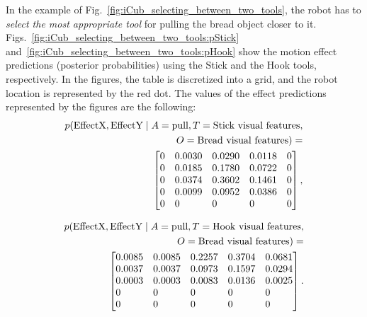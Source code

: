 In the example of
Fig.~\ref{fig:iCub_selecting_between_two_tools}, the robot has to \emph{select the most appropriate tool}
for pulling
the bread object
closer to it.
Figs.~\ref{fig:iCub_selecting_between_two_tools:pStick} and~\ref{fig:iCub_selecting_between_two_tools:pHook} show the motion effect predictions (posterior probabilities) using the Stick and the Hook tools, respectively.
In the figures, the table is discretized into a grid, and the robot location is represented by the red dot.
The values of the effect predictions represented by the figures are the following:
\begin{equation} \label{eq:posterior_pull_with_stick}
\begin{split}
p(\EffectX, \EffectY \given A=\text{pull}, T=\text{Stick visual features}, \\
O=\text{Bread visual features}) = \\
    \begin{bmatrix*}[l] %
    0 &   0.0030 &   0.0290 &   0.0118 &        0 \\
    0 &   0.0185 &   0.1780 &   0.0722 &        0 \\
    0 &   0.0374 &   0.3602 &   0.1461 &        0 \\
    0 &   0.0099 &   0.0952 &   0.0386 &        0 \\
    0 &        0 &        0 &        0 &        0
    \end{bmatrix*},
\end{split}
\end{equation}

\begin{equation} \label{eq:posterior_pull_with_hook}
\begin{split}
p(\EffectX, \EffectY \given A=\text{pull}, T=\text{Hook visual features}, \\
O=\text{Bread visual features}) = \\
    \begin{bmatrix*}[l] %
    0.0085 &   0.0085 &   0.2257 &   0.3704 &   0.0681 \\
    0.0037 &   0.0037 &   0.0973 &   0.1597 &   0.0294 \\
    0.0003 &   0.0003 &   0.0083 &   0.0136 &   0.0025 \\
    0      &   0      &   0      &   0      &   0 \\
    0      &   0      &   0      &   0      &   0
    \end{bmatrix*}.
\end{split}
\end{equation}

